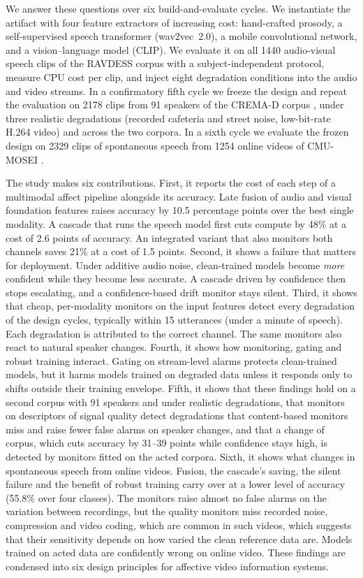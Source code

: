 We answer these questions over six build-and-evaluate cycles. We instantiate the artifact with four feature extractors of increasing cost: hand-crafted prosody, a self-supervised speech transformer (wav2vec~2.0), a mobile convolutional network, and a vision--language model (CLIP). We evaluate it on all 1440 audio-visual speech clips of the RAVDESS corpus \citep{livingstone2018} with a subject-independent protocol, measure CPU cost per clip, and inject eight degradation conditions into the audio and video streams. In a confirmatory fifth cycle we freeze the design and repeat the evaluation on 2178 clips from 91 speakers of the CREMA-D corpus \citep{cao2014}, under three realistic degradations (recorded cafeteria and street noise, low-bit-rate H.264 video) and across the two corpora. In a sixth cycle we evaluate the frozen design on 2329 clips of spontaneous speech from 1254 online videos of CMU-MOSEI \citep{zadeh2018}.

The study makes six contributions. First, it reports the cost of each step of a multimodal affect pipeline alongside its accuracy. Late fusion of audio and visual foundation features raises accuracy by 10.5 percentage points over the best single modality. A cascade that runs the speech model first cuts compute by 48\% at a cost of 2.6 points of accuracy. An integrated variant that also monitors both channels saves 21\% at a cost of 1.5 points. Second, it shows a failure that matters for deployment. Under additive audio noise, clean-trained models become \emph{more} confident while they become less accurate. A cascade driven by confidence then stops escalating, and a confidence-based drift monitor stays silent. Third, it shows that cheap, per-modality monitors on the input features detect every degradation of the design cycles, typically within 15 utterances (under a minute of speech). Each degradation is attributed to the correct channel. The same monitors also react to natural speaker changes. Fourth, it shows how monitoring, gating and robust training interact. Gating on stream-level alarms protects clean-trained models, but it harms models trained on degraded data unless it responds only to shifts outside their training envelope. Fifth, it shows that these findings hold on a second corpus with 91 speakers and under realistic degradations, that monitors on descriptors of signal quality detect degradations that content-based monitors miss and raise fewer false alarms on speaker changes, and that a change of corpus, which cuts accuracy by 31--39 points while confidence stays high, is detected by monitors fitted on the acted corpora. Sixth, it shows what changes in spontaneous speech from online videos. Fusion, the cascade's saving, the silent failure and the benefit of robust training carry over at a lower level of accuracy (55.8\% over four classes). The monitors raise almost no false alarms on the variation between recordings, but the quality monitors miss recorded noise, compression and video coding, which are common in such videos, which suggests that their sensitivity depends on how varied the clean reference data are. Models trained on acted data are confidently wrong on online video. These findings are condensed into six design principles for affective video information systems.

